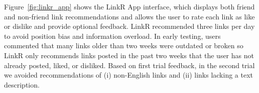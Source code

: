 Figure~\ref{fig:linkr_app} shows the LinkR App interface, which
displays both friend and non-friend link recommendations and allows
the user to rate each link as like or dislike and provide optional
feedback.  LinkR recommended three links per day to 
avoid position bias and information overload.  In early testing, users 
commented that many links older than two weeks were outdated or
broken so LinkR only recommends links posted in the past two
weeks that the user has not already posted, liked, or disliked.  Based
on first trial feedback, in the second trial we avoided
recommendations of (i) non-English links and (ii) links lacking a text
description.

 